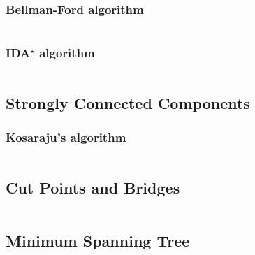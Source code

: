 \documentclass[9pt,a4paper,twocolumn,landscape,oneside]{amsart}
\newcommand{\code}[1]{\inputminted{cpp}{_code/#1}}
\newif\ifverbose
\begin{document}
        \subsubsection{Bellman-Ford algorithm}
            \ifverbose
            The Bellman-Ford algorithm solves the single-source shortest paths
            problem in $O(|V||E|)$ time. It is slower than Dijkstra's
            algorithm, but it works on graphs with negative edges and has the
            ability to detect negative cycles, neither of which Dijkstra's
            algorithm can do.
            \fi
            \code{graph/bellman_ford.cpp}

        \subsubsection{IDA$^\star$ algorithm}
            \code{graph/idastar.cpp}

    \ifverbose
    \subsection{All-Pairs Shortest Paths}
        \subsubsection{Floyd-Warshall algorithm}
            The Floyd-Warshall algorithm solves the all-pairs shortest paths
            problem in $O(|V|^3)$ time.
            \code{graph/floyd_warshall.cpp}
    \fi

    \subsection{Strongly Connected Components}
        \subsubsection{Kosaraju's algorithm}
            \ifverbose
            Kosarajus's algorithm finds strongly connected components of a
            directed graph in $O(|V|+|E|)$ time.
            \fi
            \code{graph/scc.cpp}

    \subsection{Cut Points and Bridges}
        \code{graph/cut_points_and_bridges.cpp}

    \ifverbose
    \subsection{Minimum Spanning Tree}
\end{document}
